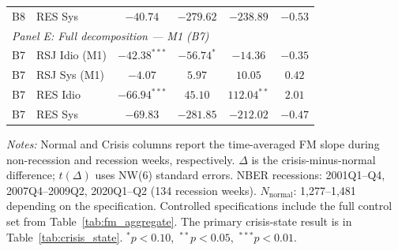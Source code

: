 \documentclass[11pt,a4paper]{article}
\begin{document}
\begin{table}[!htbp]
\begin{threeparttable}
\begin{tabular}{l l c c c c}
B8 & RES Sys & $-40.74$ & $-279.62$ & $-238.89$ & $-0.53$ \\[5pt]
\multicolumn{6}{l}{\textit{Panel E: Full decomposition --- M1 (B7)}} \\[2pt]
B7 & RSJ Idio (M1) & $-42.38^{***}$ & $-56.74^{*}$ & $-14.36$ & $-0.35$ \\
B7 & RSJ Sys (M1) & $-4.07$ & $5.97$ & $10.05$ & $0.42$ \\
B7 & RES Idio & $-66.94^{***}$ & $45.10$ & $112.04^{**}$ & $2.01$ \\
B7 & RES Sys & $-69.83$ & $-281.85$ & $-212.02$ & $-0.47$ \\
\bottomrule
\end{tabular}
\begin{tablenotes}
\footnotesize
\item \textit{Notes:} Normal and Crisis columns report the time-averaged FM slope
during non-recession and recession weeks, respectively. $\Delta$ is the
crisis-minus-normal difference; $t(\Delta)$ uses NW(6) standard errors.
NBER recessions: 2001Q1--Q4, 2007Q4--2009Q2, 2020Q1--Q2 (134 recession weeks).
$N_{\text{normal}}$: 1{,}277--1{,}481 depending on the specification. Controlled
specifications include the full control set from Table~\ref{tab:fm_aggregate}.
The primary crisis-state result is in Table~\ref{tab:crisis_state}.
$^{*}p<0.10$,\ $^{**}p<0.05$,\ $^{***}p<0.01$.
\end{tablenotes}
\end{threeparttable}
\end{table}
\end{document}
